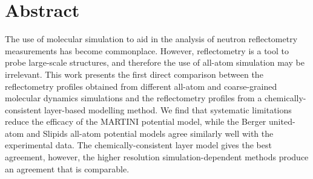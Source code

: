 \section*{Abstract}
The use of molecular simulation to aid in the analysis of neutron reflectometry measurements has become commonplace.
However, reflectometry is a tool to probe large-scale structures, and therefore the use of all-atom simulation may be irrelevant.
This work presents the first direct comparison between the reflectometry profiles obtained from different all-atom and coarse-grained molecular dynamics simulations and the reflectometry profiles from a chemically-consistent layer-based modelling method.
We find that systematic limitations reduce the efficacy of the MARTINI potential model, while the Berger united-atom and Slipids all-atom potential models agree similarly well with the experimental data.
The chemically-consistent layer model gives the best agreement, however, the higher resolution simulation-dependent methods produce an agreement that is comparable.
